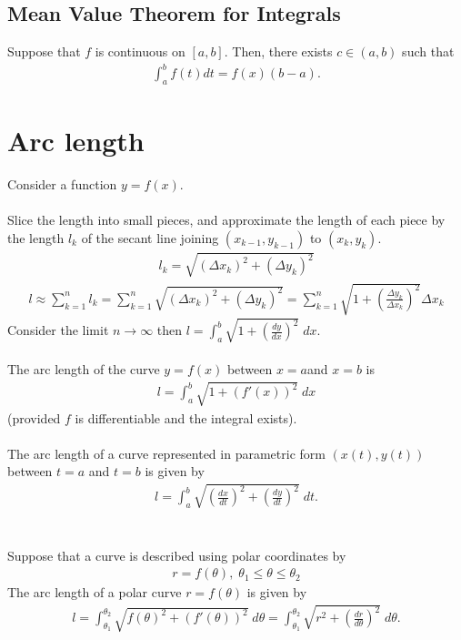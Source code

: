 \documentclass{report}
\begin{document}
		\subsection{Mean Value Theorem for Integrals}

			Suppose that $f$ is continuous on $[a,b]$. Then, there exists $c \in (a,b)$ such that
			\begin{align*}
				\int_a^b f(t)dt = f(x)(b-a).
			\end{align*}
			
	\section{Arc length}

		Consider a function $y = f(x)$.
		\\ \\
		Slice the length into small pieces, and approximate the length of each piece by the length $l_k$ of the secant line joining $(x_{k-1}, y_{k-1})$ to $(x_k, y_k)$.
		\begin{align*}
			l_k = \sqrt{(\Delta x_k)^2 + (\Delta y_k)^2}
		\end{align*}
		\begin{align*}
			l \approx \sum_{k=1}^n l_k = \sum_{k=1}^n \sqrt{(\Delta x_k)^2 + (\Delta y_k)^2} = \sum_{k=1}^n \sqrt{1 + \left(\frac{\Delta y_k}{\Delta x_k}\right)^2} \Delta x_k
		\end{align*}
		Consider the limit $n \to \infty$ then $l = \int_a^b \sqrt{1 + \left(\frac{dy}{dx}\right)^2} \; dx$.
		\\ \\
		The arc length of the curve $y = f(x)$ between $x = a$and $x = b$ is 
		\begin{align*}
			l = \int_a^b \sqrt{1 + (f'(x))^2} \; dx
		\end{align*}
		(provided $f$ is differentiable and the integral exists).
		\\ \\
		The arc length of a curve represented in parametric form $(x(t), y(t))$ between $t = a$ and $t = b$ is given by
		\begin{align*}
			l = \int_a^b \sqrt{\left(\frac{dx}{dt}\right)^2 + \left(\frac{dy}{dt}\right)^2} \; dt.
		\end{align*}
		\\ \\
		Suppose that a curve is described using polar coordinates by
		\begin{align*}
			r = f(\theta), \; \theta_1 \leq \theta \leq \theta_2
		\end{align*}
		The arc length of a polar curve $r = f(\theta)$ is given by
		\begin{align*}
			l = \int_{\theta_1}^{\theta_2} \sqrt{f(\theta)^2 + \left(f'(\theta)\right)^2} \; d\theta = \int_{\theta_1}^{\theta_2} \sqrt{r^2 + \left(\frac{dr}{d\theta}\right)^2} \; d\theta.
		\end{align*}
\end{document}
